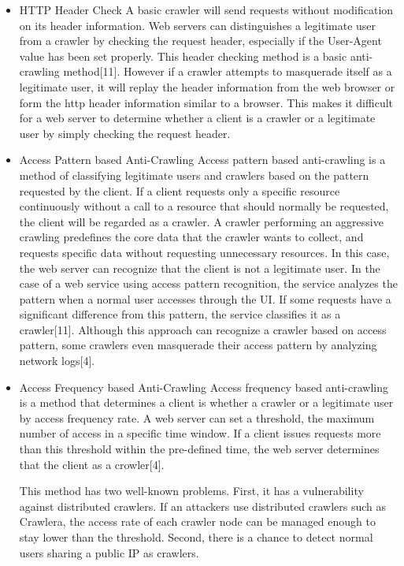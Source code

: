 \documentclass[sigconf,anonymous=true]{acmart}
\begin{document}
\begin{itemize}
\item HTTP Header Check\newline
A basic crawler will send requests without modification on its header information. Web servers can distinguishes a legitimate user from a crawler by checking the request header, especially if the User-Agent value has been set properly. This header checking method is a basic anti-crawling method[11].
However if a crawler attempts to masquerade itself as a legitimate user, it will replay the header information from the web browser or form the http header information similar to a browser. This makes it difficult for a web server to determine whether a client is a crawler or a legitimate user by simply checking the request header.

\item Access Pattern based Anti-Crawling\newline
Access pattern based anti-crawling is a method of classifying legitimate users and crawlers based on the pattern requested by the client. If a client requests only a specific resource continuously without a call to a resource that should normally be requested, the client will be regarded as a crawler. 
A crawler performing an aggressive crawling predefines the core data that the crawler wants to collect, and requests specific data without requesting unnecessary resources. In this case, the web server can recognize that the client is not a legitimate user.
In the case of a web service using access pattern recognition, the service analyzes the pattern when a normal user accesses through the UI. If some requests have a significant difference from this pattern, the service classifies it as a crawler[11].
Although this approach can recognize a crawler based on access pattern, some crawlers even masquerade their access pattern by analyzing network logs[4].

\item Access Frequency based Anti-Crawling\newline
Access frequency based anti-crawling is a method that determines a client is whether a crawler or a legitimate user by access frequency rate. A web server can set a threshold, the maximum number of access in a specific time window. If a client issues requests more than this threshold within the pre-defined time, the web server determines that the client as a crowler[4].

This method has two well-known problems. 
First, it has a vulnerability against distributed crawlers. If an attackers use distributed crawlers such as Crawlera, the access rate of each crawler node can be managed enough to stay lower than the threshold.
Second, there is a chance to detect normal users sharing a public IP as crawlers.
\end{itemize}
\end{document}
